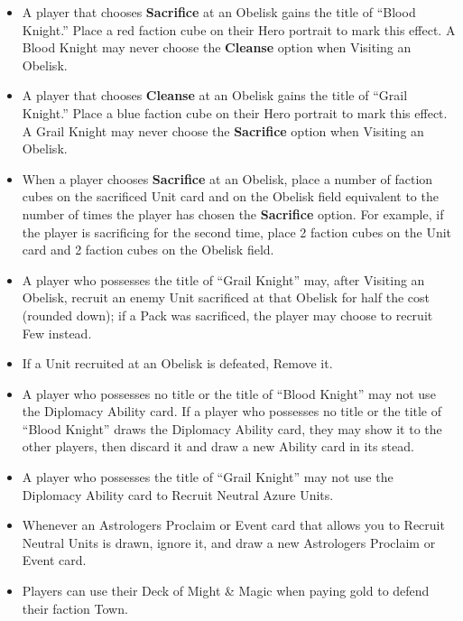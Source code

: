\begin{multicols*}{2}
\begin{itemize}
\begin{enumerate}[leftmargin=15pt]
\begin{enumerate}
        \end{enumerate}
    \end{enumerate}
    \item A player that chooses \textbf{Sacrifice} at an Obelisk gains the title of ``\textcolor{darkcandyapplered}{Blood Knight}.'' Place a red faction cube on their Hero portrait to mark this effect. A \textcolor{darkcandyapplered}{Blood Knight} may never choose the \textbf{Cleanse} option when Visiting an Obelisk.
    \item A player that chooses \textbf{Cleanse} at an Obelisk gains the title of ``\textcolor{darkcerulean}{Grail Knight}.'' Place a blue faction cube on their Hero portrait to mark this effect. A \textcolor{darkcerulean}{Grail Knight} may never choose the \textbf{Sacrifice} option when Visiting an Obelisk.
    \item When a player chooses \textbf{Sacrifice} at an Obelisk, place a number of faction cubes on the sacrificed Unit card and on the Obelisk field equivalent to the number of times the player has chosen the \textbf{Sacrifice} option. For example, if the player is sacrificing for the second time, place 2 faction cubes on the Unit card and 2 faction cubes on the Obelisk field.
    \item A player who possesses the title of ``\textcolor{darkcerulean}{Grail Knight}'' may, after Visiting an Obelisk, recruit an enemy Unit sacrificed at that Obelisk for half the cost (rounded down); if a Pack was sacrificed, the player may choose to recruit Few instead.
    \item If a Unit recruited at an Obelisk is defeated, Remove it.
    \item A player who possesses no title or the title of ``\textcolor{darkcandyapplered}{Blood Knight}'' may not use the Diplomacy Ability card. If a player who possesses no title or the title of ``\textcolor{darkcandyapplered}{Blood Knight}'' draws the Diplomacy Ability card, they may show it to the other players, then discard it and draw a new Ability card in its stead.
    \item A player who possesses the title of ``\textcolor{darkcerulean}{Grail Knight}'' may not use the Diplomacy Ability card to Recruit Neutral Azure Units.
    \item Whenever an Astrologers Proclaim or Event card that allows you to Recruit Neutral Units is drawn, ignore it, and draw a new Astrologers Proclaim or Event card.
    \item Players can use their Deck of Might \& Magic when paying gold to defend their faction Town.

\end{itemize}
\end{multicols*}
